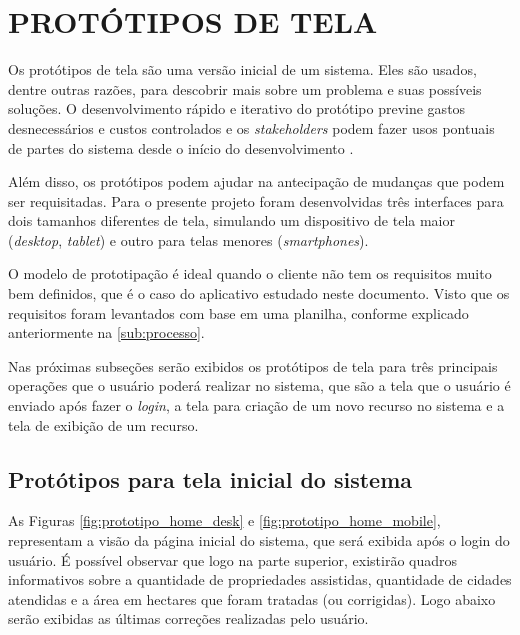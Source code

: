 \section{PROTÓTIPOS DE TELA}
\label{sec:titSecPrototipos}

Os protótipos de tela são uma versão inicial de um sistema. Eles são usados, dentre outras razões, para descobrir mais sobre um problema e suas possíveis soluções. O desenvolvimento rápido e iterativo do protótipo previne gastos desnecessários e custos controlados e os \textit{stakeholders} podem fazer usos pontuais de partes do sistema desde o início do desenvolvimento .

Além disso, os protótipos podem ajudar na antecipação de mudanças que podem ser requisitadas.
Para o presente projeto foram desenvolvidas três interfaces para dois tamanhos diferentes de tela, simulando um dispositivo de tela maior (\textit{desktop}, \textit{tablet}) e outro para telas menores (\textit{smartphones}).

O modelo de prototipação é ideal quando o cliente não tem os requisitos muito bem definidos, que é o caso do aplicativo estudado neste documento. Visto que os requisitos foram levantados com base em uma planilha, conforme explicado anteriormente na \autoref{sub:processo}.

Nas próximas subseções serão exibidos os protótipos de tela para três principais operações que o usuário poderá realizar no sistema, que são a tela que o usuário é enviado após fazer o \textit{login}, a tela para criação de um novo recurso no sistema e a tela de exibição de um recurso.

\subsection{Protótipos para tela inicial do sistema}
\label{sec:titSecPrototiposHome}

As Figuras \ref{fig:prototipo_home_desk} e \ref{fig:prototipo_home_mobile}, representam a visão da página inicial do sistema, que será exibida após o login do usuário. É possível observar que logo na parte superior, existirão quadros informativos sobre a quantidade de propriedades assistidas, quantidade de cidades atendidas e a área em hectares que foram tratadas (ou corrigidas). Logo abaixo serão exibidas as últimas correções realizadas pelo usuário.

